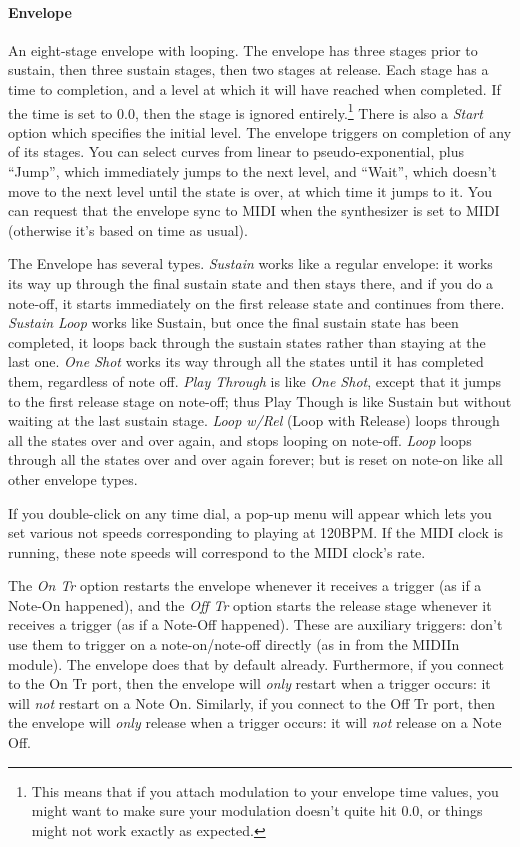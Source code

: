 \documentclass{article}
\begin{document}
\paragraph{Envelope}  An eight-stage envelope with looping.  The envelope has three stages prior to sustain, then three sustain stages, then two stages at release.  Each stage has a time to completion, and a level at which it will have reached when completed.  If the time is set to 0.0, then the stage is ignored entirely.\footnote{This means that if you attach modulation to your envelope time values, you might want to make sure your modulation doesn't quite hit 0.0, or things might not work exactly as expected.}  There is also a {\it Start} option which specifies the initial level.  The envelope triggers on completion of any of its stages.  You can select curves from linear to pseudo-exponential, plus ``Jump'', which immediately jumps to the next level, and ``Wait'', which doesn't move to the next level until the state is over, at which time it jumps to it.  You can request that the envelope sync to MIDI when the synthesizer is set to MIDI (otherwise it's based on time as usual). 

The Envelope has several types.  {\it Sustain} works like a regular envelope: it works its way up through the final sustain state and then stays there, and if you do a note-off, it starts immediately on the first release state and continues from there.  {\it Sustain Loop} works like Sustain, but once the final sustain state has been completed, it loops back through the sustain states rather than staying at the last one.  {\it One Shot} works its way through all the states until  it has completed them, regardless of note off.  {\it Play Through} is like {\it One Shot}, except that it jumps to the first release stage on note-off; thus Play Though is like Sustain but without waiting at the last sustain stage.  {\it Loop w/Rel} (Loop with Release) loops through all the states over and over again, and stops looping on note-off.  {\it Loop} loops through all the states over and over again forever; but is reset on note-on like all other envelope types.
   
If you double-click on any time dial, a pop-up menu will appear which lets you set various not speeds corresponding to playing at 120BPM.  If the MIDI clock is running, these note speeds will correspond to the MIDI clock's rate.

The {\it On Tr} option restarts the envelope whenever it receives a trigger (as if a Note-On happened), and the {\it Off Tr} option starts the release stage whenever it receives a trigger (as if a Note-Off happened).  These are auxiliary triggers: don't use them to trigger on a note-on/note-off directly (as in from the MIDIIn module).  The envelope does that by default already.  Furthermore, if you connect to the On Tr port, then the envelope will {\it only} restart when a trigger occurs: it will {\it not} restart on a Note On.  Similarly, if you connect to the Off Tr port, then the envelope will {\it only} release when a trigger occurs: it will {\it not} release on a Note Off.
\end{document}

